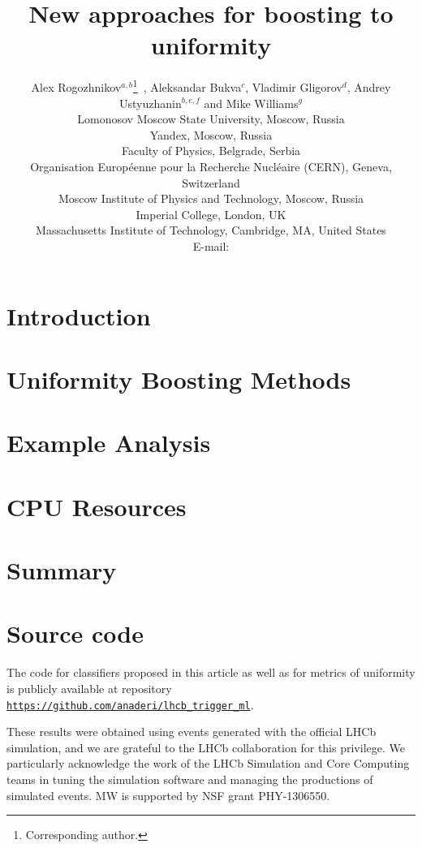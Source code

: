 \documentclass{JINST}
\title{New approaches for boosting to uniformity}
\author{
Alex Rogozhnikov$^{a,b}$\thanks{Corresponding author.}~,
Aleksandar Bukva$^c$, 
Vladimir Gligorov$^d$,
Andrey Ustyuzhanin$^{b,e,f}$ and
Mike Williams$^g$\\
\llap{$^a$}Lomonosov Moscow State University, Moscow, Russia\\
\llap{$^b$}Yandex, Moscow, Russia\\
\llap{$^c$}Faculty of Physics, Belgrade, Serbia \\
\llap{$^d$}Organisation Europ\'eenne pour la Recherche Nucl\'eaire (CERN), Geneva, Switzerland  \\
\llap{$^e$}Moscow Institute of Physics and Technology, Moscow, Russia\\
\llap{$^f$}Imperial College, London, UK\\
\llap{$^g$}Massachusetts Institute of Technology, Cambridge, MA, United States \\
E-mail: \email{alex.rogozhnikov@yandex.ru}}
\theoremstyle{definition}
\theoremstyle{remark}
\begin{document}
\maketitle


\section{Introduction}



\section{Uniformity Boosting Methods}


\section{Example Analysis}



\section{CPU Resources}



\section{Summary}



\section{Source code}

The code for classifiers proposed in this article as well as for metrics of uniformity is publicly available at repository 
{\tt \href{https://github.com/anaderi/lhcb_trigger_ml}{https://github.com/anaderi/lhcb\_trigger\_ml}}.

\acknowledgments

These results were obtained using events generated with the official LHCb simulation, and we are grateful to the LHCb collaboration for this privilege. 
We particularly acknowledge the work of the LHCb Simulation and Core Computing teams in tuning the simulation software and managing the productions of simulated events.
MW is supported by NSF grant PHY-1306550.
\end{document}
